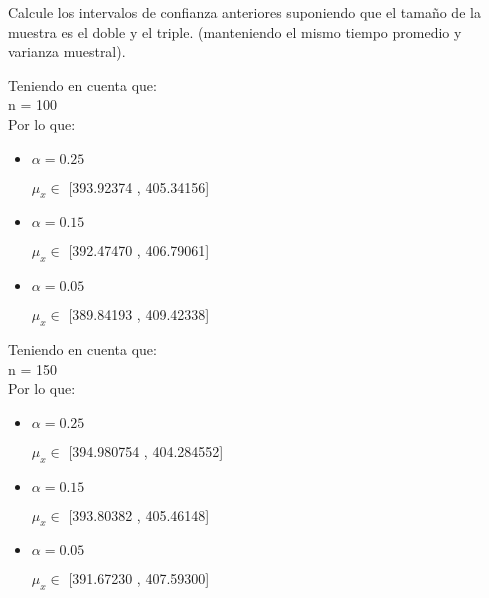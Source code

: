 Calcule los intervalos de confianza anteriores suponiendo que el tama\~no de la muestra es el doble y el
triple. (manteniendo el mismo tiempo promedio y varianza muestral).

Teniendo en cuenta que: \\

n = 100\\

Por lo que: \\

\begin{itemize}

\item $\alpha = 0.25$

$\mu_x \in$ [393.92374 , 405.34156]

\item $\alpha = 0.15$

$\mu_x \in$ [392.47470 , 406.79061]

\item $\alpha = 0.05$

$\mu_x \in$ [389.84193 , 409.42338]

\end{itemize}

Teniendo en cuenta que: \\

n = 150\\

Por lo que: \\

\begin{itemize}

\item $\alpha = 0.25$

$\mu_x \in$ [394.980754 , 404.284552]

\item $\alpha = 0.15$

$\mu_x \in$ [393.80382 , 405.46148]

\item $\alpha = 0.05$

$\mu_x \in$ [391.67230 , 407.59300]

\end{itemize}
